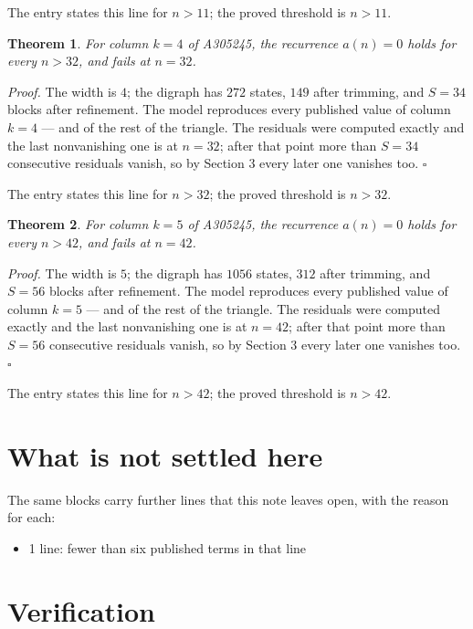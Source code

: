 \documentclass[11pt]{article}
\newtheorem{theorem}{Theorem}
\theoremstyle{definition}
\begin{document}
The entry states this line for $n > 11$; the proved threshold is $n > 11$.

\begin{theorem} For column $k = 4$ of A305245, the recurrence $a(n) = 0$ holds for every $n > 32$, and fails at $n = 32$.\end{theorem}

{\itshape Proof.} The width is $4$; the digraph has $272$ states, $149$ after trimming, and $S = 34$ blocks after refinement. The model reproduces every published value of column $k = 4$ --- and of the rest of the triangle. The residuals were computed exactly and the last nonvanishing one is at $n = 32$; after that point more than $S = 34$ consecutive residuals vanish, so by Section 3 every later one vanishes too. $\square$

The entry states this line for $n > 32$; the proved threshold is $n > 32$.

\begin{theorem} For column $k = 5$ of A305245, the recurrence $a(n) = 0$ holds for every $n > 42$, and fails at $n = 42$.\end{theorem}

{\itshape Proof.} The width is $5$; the digraph has $1056$ states, $312$ after trimming, and $S = 56$ blocks after refinement. The model reproduces every published value of column $k = 5$ --- and of the rest of the triangle. The residuals were computed exactly and the last nonvanishing one is at $n = 42$; after that point more than $S = 56$ consecutive residuals vanish, so by Section 3 every later one vanishes too. $\square$

The entry states this line for $n > 42$; the proved threshold is $n > 42$.

\section{What is not settled here}

The same blocks carry further lines that this note leaves open, with the reason for each:

\begin{itemize}

\item 1 line: fewer than six published terms in that line

\end{itemize}

\section{Verification}
\end{document}
